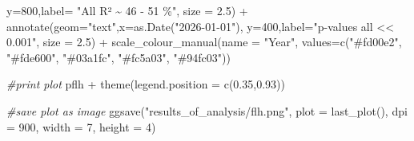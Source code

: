 \documentclass[a4paper,11pt]{article}
\newenvironment{Shaded}{\begin{snugshade}}{\end{snugshade}}
\newcommand{\AttributeTok}[1]{\textcolor[rgb]{0.77,0.63,0.00}{#1}}
\newcommand{\CommentTok}[1]{\textcolor[rgb]{0.56,0.35,0.01}{\textit{#1}}}
\newcommand{\DecValTok}[1]{\textcolor[rgb]{0.00,0.00,0.81}{#1}}
\newcommand{\FloatTok}[1]{\textcolor[rgb]{0.00,0.00,0.81}{#1}}
\newcommand{\FunctionTok}[1]{\textcolor[rgb]{0.00,0.00,0.00}{#1}}
\newcommand{\NormalTok}[1]{#1}
\newcommand{\SpecialCharTok}[1]{\textcolor[rgb]{0.00,0.00,0.00}{#1}}
\newcommand{\StringTok}[1]{\textcolor[rgb]{0.31,0.60,0.02}{#1}}
\begin{document}
\begin{Shaded}
\begin{Highlighting}[]
           \AttributeTok{y=}\DecValTok{800}\NormalTok{,}\AttributeTok{label=} \StringTok{"All R²  \textasciitilde{} 46 {-} 51 \%"}\NormalTok{, }\AttributeTok{size =} \FloatTok{2.5}\NormalTok{) }\SpecialCharTok{+}
  \FunctionTok{annotate}\NormalTok{(}\AttributeTok{geom=}\StringTok{"text"}\NormalTok{,}\AttributeTok{x=}\FunctionTok{as.Date}\NormalTok{(}\StringTok{"2026{-}01{-}01"}\NormalTok{),}
           \AttributeTok{y=}\DecValTok{400}\NormalTok{,}\AttributeTok{label=}\StringTok{"p{-}values all \textless{}\textless{} 0.001"}\NormalTok{, }\AttributeTok{size =} \FloatTok{2.5}\NormalTok{) }\SpecialCharTok{+}
  \FunctionTok{scale\_colour\_manual}\NormalTok{(}\AttributeTok{name =} \StringTok{"Year"}\NormalTok{, }
                      \AttributeTok{values=}\FunctionTok{c}\NormalTok{(}\StringTok{"\#fd00e2"}\NormalTok{, }\StringTok{"\#fde600"}\NormalTok{, }
                               \StringTok{"\#03a1fc"}\NormalTok{, }\StringTok{"\#fc5a03"}\NormalTok{, }\StringTok{"\#94fc03"}\NormalTok{)) }

\CommentTok{\#print plot}
\NormalTok{pflh }\SpecialCharTok{+}  \FunctionTok{theme}\NormalTok{(}\AttributeTok{legend.position =} \FunctionTok{c}\NormalTok{(}\FloatTok{0.35}\NormalTok{,}\FloatTok{0.93}\NormalTok{))}

\CommentTok{\#save plot as image}
\FunctionTok{ggsave}\NormalTok{(}\StringTok{"results\_of\_analysis/flh.png"}\NormalTok{,}
       \AttributeTok{plot =} \FunctionTok{last\_plot}\NormalTok{(),}
       \AttributeTok{dpi =} \DecValTok{900}\NormalTok{,}
       \AttributeTok{width =} \DecValTok{7}\NormalTok{,}
       \AttributeTok{height =} \DecValTok{4}\NormalTok{)}
\end{Highlighting}
\end{Shaded}
\newpage
\end{document}

